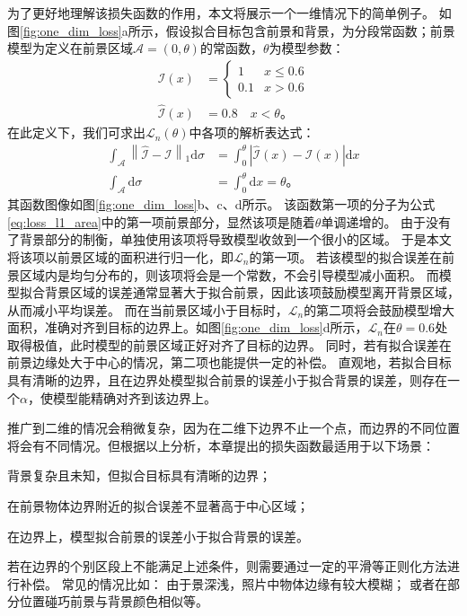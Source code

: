 为了更好地理解该损失函数的作用，本文将展示一个一维情况下的简单例子。
如图\ref{fig:one_dim_loss}a所示，假设拟合目标包含前景和背景，为分段常函数；前景模型为定义在前景区域$\mathcal{A}=(0,\theta)$的常函数，$\theta$为模型参数：
\begin{align}
\mathcal{I}(x) &= \begin{cases}
    1   & x \leq 0.6 \\
    0.1 & x > 0.6
\end{cases}\\
\hat{\mathcal{I}}(x) &= 0.8 \quad x < \theta
\text{。}
\end{align}
在此定义下，我们可求出$\mathcal{L}_n(\theta)$中各项的解析表达式：
\begin{align}
\int_{\mathcal{A}} \left\| \hat{\mathcal{I}} - \mathcal{I} \right\|_1 \mathrm{d}\sigma
&= \int_0^{\theta} \left| \hat{\mathcal{I}}(x) - \mathcal{I}(x) \right| \mathrm{d}x \\
\int_{\mathcal{A}}\mathrm{d}\sigma &= \int_0^{\theta} \mathrm{d}x = \theta
\text{。}
\end{align}
其函数图像如图\ref{fig:one_dim_loss}b、c、d所示。
该函数第一项的分子为公式\ref{eq:loss_l1_area}中的第一项前景部分，显然该项是随着$\theta$单调递增的。
由于没有了背景部分的制衡，单独使用该项将导致模型收敛到一个很小的区域。
于是本文将该项以前景区域的面积进行归一化，即$\mathcal{L}_n$的第一项。
若该模型的拟合误差在前景区域内是均匀分布的，则该项将会是一个常数，不会引导模型减小面积。
而模型拟合背景区域的误差通常显著大于拟合前景，因此该项鼓励模型离开背景区域，从而减小平均误差。
而在当前景区域小于目标时，$\mathcal{L}_n$的第二项将会鼓励模型增大面积，准确对齐到目标的边界上。如图\ref{fig:one_dim_loss}d所示，$\mathcal{L}_n$在$\theta=0.6$处取得极值，此时模型的前景区域正好对齐了目标的边界。
同时，若有拟合误差在前景边缘处大于中心的情况，第二项也能提供一定的补偿。
直观地，若拟合目标具有清晰的边界，且在边界处模型拟合前景的误差小于拟合背景的误差，则存在一个$\alpha$，使模型能精确对齐到该边界上。

推广到二维的情况会稍微复杂，因为在二维下边界不止一个点，而边界的不同位置将会有不同情况。但根据以上分析，本章提出的损失函数最适用于以下场景：
\begin{enumerate*}
    \item 背景复杂且未知，但拟合目标具有清晰的边界；
    \item 在前景物体边界附近的拟合误差不显著高于中心区域；
    \item 在边界上，模型拟合前景的误差小于拟合背景的误差。
\end{enumerate*}
若在边界的个别区段上不能满足上述条件，则需要通过一定的平滑等正则化方法进行补偿。
常见的情况比如：
由于景深浅，照片中物体边缘有较大模糊；
或者在部分位置碰巧前景与背景颜色相似等。

